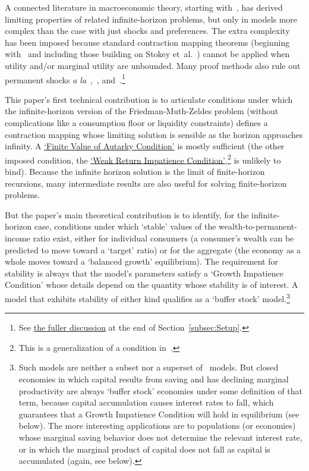 \documentclass[BufferStockTheory]{subfiles}
\begin{document}
A connected literature in macroeconomic theory, starting with~\cite{bewleyPIH}, has derived limiting properties of related infinite-horizon problems, but only in models more complex than the case with just shocks and preferences. The extra complexity has been imposed because standard contraction mapping theorems (beginning with~\cite{bellmanDynamicProgramming} and including those building on Stokey et~al.~\citeyearpar{slpMethods}) cannot be applied when utility and/or marginal utility are unbounded. Many proof methods also rule out permanent shocks \textit{a la}~\cite{friedmanATheory},~\cite{muthOptimal}, and~\cite{zeldesStochastic}.\footnote{See \hyperlink{DiffFromLit}{the fuller discussion} at the end of Section~\ref{subsec:Setup}.}

This paper's first technical contribution is to articulate conditions under which the infinite-horizon version of the Friedman-Muth-Zeldes problem (without complications like a consumption floor or liquidity constraints) defines a contraction mapping whose limiting solution is sensible as the horizon approaches infinity.  A \hyperlink{FVAC}{`Finite Value of Autarky Condition'} is mostly sufficient (the other imposed condition, the \hyperlink{WRIC}{`Weak Return Impatience Condition'},\footnote{This is a generalization of a condition in~\cite{mstIncFluct}.} is unlikely to bind).  Because the infinite horizon solution is the limit of finite-horizon recursions, many intermediate results are also useful for solving finite-horizon problems.

But the paper's main theoretical contribution is to identify, for the infinite-horizon case, conditions under which `stable' values of the wealth-to-permanent-income ratio exist, either for individual consumers (a consumer's wealth can be predicted to move toward a `target' ratio) or for the aggregate (the economy as a whole moves toward a `balanced growth' equilibrium).  The requirement for stability is always that the model's parameters satisfy a `Growth Impatience Condition' whose details depend on the quantity whose stability is of interest.  A model that exhibits stability of either kind qualifies as a `buffer stock' model.\footnote{Such models are neither a subset nor a superset of~\cite{bewleyPIH} models.  But closed economies in which capital results from saving and has declining marginal productivity are always `buffer stock' economies under some definition of that term, because capital accumulation causes interest rates to fall, which guarantees that a Growth Impatience Condition will hold in equilibrium (see below).  The more interesting applications are to populations (or economies) whose marginal saving behavior does not determine the relevant interest rate, or in which the marginal product of capital does not fall as capital is accumulated (again, see below).}
\end{document}
